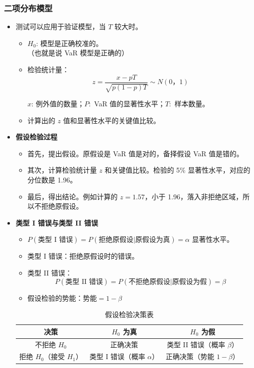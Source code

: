 

\subsubsection{二项分布模型}
    \begin{itemize}
    \item 测试可以应用于验证模型，当 \( T \) 较大时。
        \begin{itemize}
        \item \( H_0 \): 模型是正确校准的。\\
         （也就是说 VaR 模型是正确的）
         \item 检验统计量：
         \[
        z = \frac{x - pT}{\sqrt{p(1 - p)T}} \sim N(0，1)
        \]
       
        \( x \): 例外值的数量；\( P: \) VaR 值的显著性水平；\( T: \) 样本数量。
        \item 计算出的 \( z \) 值和显著性水平的关键值比较。
         \end{itemize}
    
     
    \item \textbf{假设检验过程}
\begin{itemize}
    \item 首先，提出假设。原假设是 VaR 值是对的，备择假设 VaR 值是错的。
    \item 其次，计算检验统计量 \( z \) 和关键值比较。检验的 5\% 显著性水平，对应的分位数是 1.96。
    \item 最后，得出结论。例如计算的 \( z = 1.57 \)，小于 1.96，落入非拒绝区域，所以不拒绝原假设。
\end{itemize}

\item \textbf{类型 I 错误与类型 II 错误}
\begin{itemize}
    \item \( P(\text{类型 I 错误}) = P(\text{拒绝原假设} | \text{原假设为真}) = \alpha \) 显著性水平。
    \item 类型 I 错误：拒绝原假设时的错误。
    \item 类型 II 错误：
    \[
    P(\text{类型 II 错误}) = P(\text{不拒绝原假设} | \text{原假设为假}) = \beta
    \]
    \item 假设检验的势能：\( \text{势能} = 1 - \beta \)
\end{itemize}

\begin{table}[h]
    \centering
    \begin{tabular}{|c|c|c|}
        \hline
        决策 & \( H_0 \) 为真 & \( H_0 \) 为假 \\
        \hline
        不拒绝 \( H_0 \) & 正确决策 & 类型 II 错误（概率 \( \beta \)） \\
        \hline
        拒绝 \( H_0 \)（接受 \( H_1 \)） & 类型 I 错误（概率 \( \alpha \)） & 正确决策（势能 \( 1 - \beta \)） \\
        \hline
    \end{tabular}
    \caption{假设检验决策表}
\end{table}


\end{itemize}
